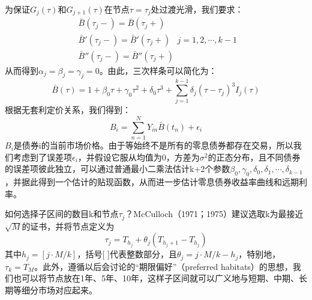 \documentclass[UTF8]{ctexart}
\begin{document}
为保证$G_j(\tau) $和$ G_{j+1}(\tau)$在节点$\tau=\tau_j$处过渡光滑，我们要求：
$$
\begin{array}{l}
\bar B(\tau_j-) = \bar B(\tau_j+) \\
\bar B'(\tau_j-) = \bar B'(\tau_j+) \\
\bar B''(\tau_j-) = \bar B''(\tau_j+) 
\end{array}
j = 1,2,\cdots,k-1
$$
从而得到$\alpha_j=\beta_j=\gamma_j=0$。由此，三次样条可以简化为：
$$\bar B(\tau)=1+\beta_0 \tau + \gamma_0 \tau^2 + \delta_0 \tau^3 + \sum\limits_{j=1}^{k-1}\delta_j(\tau-\tau_j)^3 I_j(\tau)$$
根据无套利定价关系，我们得到：
$$B_i=\sum\limits_{n=1}^N Y_{in} \bar B(t_n)+\epsilon_i$$
$B_i$是债券i的当前市场价格。由于等始终不是所有的零息债券都存在交易，所以我们考虑到了误差项$\epsilon_i$，并假设它服从均值为0，方差为$\sigma^2$的正态分布，且不同债券的误差项彼此独立，可以通过普通最小二乘法估计k+2个参数$\beta_0,\gamma_0,\delta_0,\delta_1,\cdots,\delta_{k-1}$，并据此得到一个估计的贴现函数，从而进一步估计零息债券收益率曲线和远期利率。

如何选择子区间的数目k和节点$\tau_j$？McCulloch（1971；1975）建议选取k为最接近$\sqrt M$的证书，并将节点定义为
$$\tau_j=T_{h_j}+\theta_j(T_{h_j + 1} - T_{h_j})$$
其中$h_j=[j \cdot M/k]$，括号[ ]代表整数部分，且$\theta_j=j \cdot M/k-h_j$，特别地，$\tau_k=T_M$。此外，遵循以后会讨论的“期限偏好”（preferred habitats）的思想，我们也可以将节点放在1年、5年、10年，这样子区间就可以广义地与短期、中期、长期等细分市场对应起来。
\end{document}
